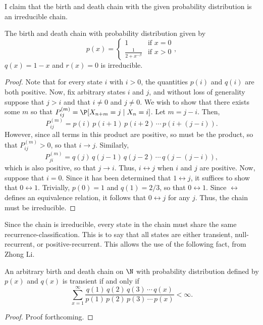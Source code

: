 I claim that the birth and death chain with the given probability distribution is an irreducible chain.
\begin{proposition}
    The birth and death chain with probability distribution given by
    \[
        p(x) = \begin{cases}
            1 & \text{if } x = 0 \\
            \frac{1}{2+x^{-\beta}} & \text{if } x > 0
        \end{cases},
    \]
    $q(x) = 1-x$ and $r(x) = 0$ is irreducible.
\end{proposition}
\begin{proof}
    Note that for every state $i$ with $i > 0$, the quantities $p(i)$ and $q(i)$ are both positive.
    Now, fix arbitrary states $i$ and $j$, and without loss of generality suppose that $j > i$ and that
    $i \neq 0$ and $j \neq 0$. We wish to show that there exists some $m$ so that $P_{ij}^{(m)} =
    \P[X_{n+m} = j \mid X_n = i]$. Let $m = j-i$. Then, 
    \[
        P_{ij}^{(m)} = p(i)\, p(i+1)\, p(i+2)\, \cdots \, p(i+(j-i)).
    \]
    However, since all terms in this product are positive, so must be the product, so that $P_{ij}^{(m)}
    > 0$, so that $i \to j$. Similarly,
    \[
        P_{ji}^{(m)} = q(j)\, q(j-1)\, q(j-2) \, \cdots \, q(j-(j-i)),
    \]
    which is also positive, so that $j \to i$. Thus, $i \leftrightarrow j$ when $i$ and $j$ are
    positive. Now, suppose that $i = 0$. Since it has been determined that $1 \leftrightarrow j$, it
    suffices to show that $0 \leftrightarrow 1$. Trivially, $p(0) = 1$ and $q(1) = 2/3$, so that $0
    \leftrightarrow 1$. Since $\leftrightarrow$ defines an equivalence relation, it follows that $0
    \leftrightarrow j$ for any $j$. Thus, the chain must be irreducible.
\end{proof}

Since the chain is irreducible, every state in the chain must share the same recurrence-classification.
This is to say that all states are either transient, null-recurrent, or positive-recurrent. This allows
the use of the following fact, from Zhong Li.
\begin{proposition}
    An arbitrary birth and death chain on $\N$ with probability distribution defined by $p(x)$ and
    $q(x)$ is transient if and only if
    \[
        \sum_{x = 1}^{\infty} \frac{q(1)\,q(2)\,q(3)\,\cdots\,q(x)}{p(1)\,p(2)\,p(3)\,\cdots\,p(x)} <
        \infty.  
    \]
\end{proposition}
\begin{proof}
    Proof forthcoming.
\end{proof}

